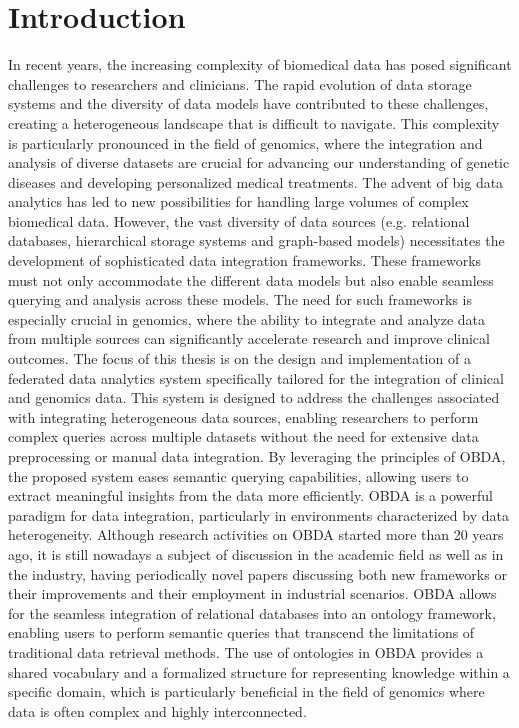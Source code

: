 
\chapter{Introduction}
\label{chp:intro}

In recent years, the increasing complexity of biomedical data has posed significant challenges to researchers and clinicians. The rapid evolution of data storage systems and the diversity of data models have contributed to these challenges, creating a heterogeneous landscape that is difficult to navigate. This complexity is particularly pronounced in the field of genomics, where the integration and analysis of diverse datasets are crucial for advancing our understanding of genetic diseases and developing personalized medical treatments.
The advent of big data analytics has led to new possibilities for handling large volumes of complex biomedical data. However, the vast diversity of data sources (e.g. relational databases, hierarchical storage systems and graph-based models) necessitates the development of sophisticated data integration frameworks. These frameworks must not only accommodate the different data models but also enable seamless querying and analysis across these models. The need for such frameworks is especially crucial in genomics, where the ability to integrate and analyze data from multiple sources can significantly accelerate research and improve clinical outcomes.
The focus of this thesis is on the design and implementation of a federated data analytics system specifically tailored for the integration of clinical and genomics data. This system is designed to address the challenges associated with integrating heterogeneous data sources, enabling researchers to perform complex queries across multiple datasets without the need for extensive data preprocessing or manual data integration. By leveraging the principles of \ac{OBDA}, the proposed system eases semantic querying capabilities, allowing users to extract meaningful insights from the data more efficiently.
\ac{OBDA} is a powerful paradigm for data integration, particularly in environments characterized by data heterogeneity. Although research activities on OBDA started more than 20 years ago, it is still nowadays a subject of discussion in the academic field as well as in the industry, having periodically novel papers discussing both new frameworks or their improvements and their employment in industrial scenarios. OBDA allows for the seamless integration of relational databases into an ontology framework, enabling users to perform semantic queries that transcend the limitations of traditional data retrieval methods. The use of ontologies in OBDA provides a shared vocabulary and a formalized structure for representing knowledge within a specific domain, which is particularly beneficial in the field of genomics where data is often complex and highly interconnected.
